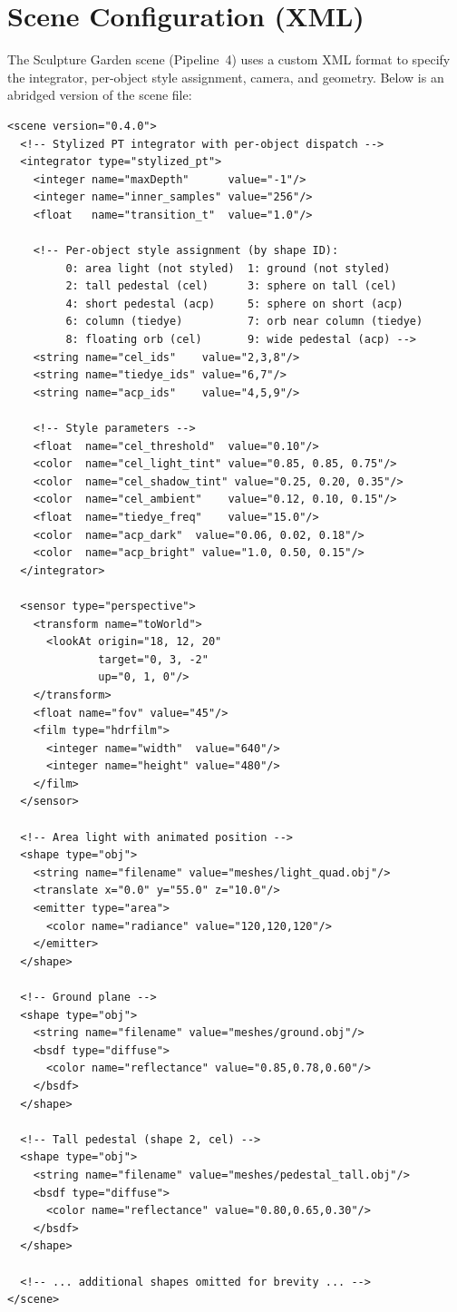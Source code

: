 \documentclass{article}
\begin{document}
\section{Scene Configuration (XML)}
\label{app:xml}

The Sculpture Garden scene (Pipeline~4) uses a custom XML format to specify the integrator, per-object style assignment, camera, and geometry. Below is an abridged version of the scene file:

\begin{lstlisting}
<scene version="0.4.0">
  <!-- Stylized PT integrator with per-object dispatch -->
  <integrator type="stylized_pt">
    <integer name="maxDepth"      value="-1"/>
    <integer name="inner_samples" value="256"/>
    <float   name="transition_t"  value="1.0"/>

    <!-- Per-object style assignment (by shape ID):
         0: area light (not styled)  1: ground (not styled)
         2: tall pedestal (cel)      3: sphere on tall (cel)
         4: short pedestal (acp)     5: sphere on short (acp)
         6: column (tiedye)          7: orb near column (tiedye)
         8: floating orb (cel)       9: wide pedestal (acp) -->
    <string name="cel_ids"    value="2,3,8"/>
    <string name="tiedye_ids" value="6,7"/>
    <string name="acp_ids"    value="4,5,9"/>

    <!-- Style parameters -->
    <float  name="cel_threshold"  value="0.10"/>
    <color  name="cel_light_tint" value="0.85, 0.85, 0.75"/>
    <color  name="cel_shadow_tint" value="0.25, 0.20, 0.35"/>
    <color  name="cel_ambient"    value="0.12, 0.10, 0.15"/>
    <float  name="tiedye_freq"    value="15.0"/>
    <color  name="acp_dark"  value="0.06, 0.02, 0.18"/>
    <color  name="acp_bright" value="1.0, 0.50, 0.15"/>
  </integrator>

  <sensor type="perspective">
    <transform name="toWorld">
      <lookAt origin="18, 12, 20"
              target="0, 3, -2"
              up="0, 1, 0"/>
    </transform>
    <float name="fov" value="45"/>
    <film type="hdrfilm">
      <integer name="width"  value="640"/>
      <integer name="height" value="480"/>
    </film>
  </sensor>

  <!-- Area light with animated position -->
  <shape type="obj">
    <string name="filename" value="meshes/light_quad.obj"/>
    <translate x="0.0" y="55.0" z="10.0"/>
    <emitter type="area">
      <color name="radiance" value="120,120,120"/>
    </emitter>
  </shape>

  <!-- Ground plane -->
  <shape type="obj">
    <string name="filename" value="meshes/ground.obj"/>
    <bsdf type="diffuse">
      <color name="reflectance" value="0.85,0.78,0.60"/>
    </bsdf>
  </shape>

  <!-- Tall pedestal (shape 2, cel) -->
  <shape type="obj">
    <string name="filename" value="meshes/pedestal_tall.obj"/>
    <bsdf type="diffuse">
      <color name="reflectance" value="0.80,0.65,0.30"/>
    </bsdf>
  </shape>

  <!-- ... additional shapes omitted for brevity ... -->
</scene>
\end{lstlisting}
\end{document}
